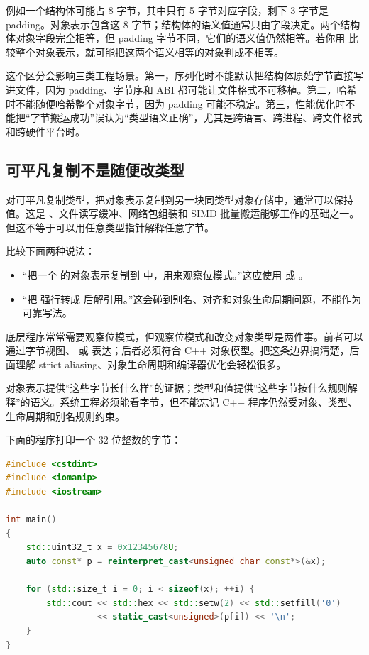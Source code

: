 例如一个结构体可能占 8 字节，其中只有 5 字节对应字段，剩下 3 字节是 padding。对象表示包含这 8 字节；结构体的语义值通常只由字段决定。两个结构体对象字段完全相等，但 padding 字节不同，它们的语义值仍然相等。若你用  比较整个对象表示，就可能把这两个语义相等的对象判成不相等。

这个区分会影响三类工程场景。第一，序列化时不能默认把结构体原始字节直接写进文件，因为 padding、字节序和 ABI 都可能让文件格式不可移植。第二，哈希时不能随便哈希整个对象字节，因为 padding 可能不稳定。第三，性能优化时不能把“字节搬运成功”误认为“类型语义正确”，尤其是跨语言、跨进程、跨文件格式和跨硬件平台时。

\subsection{可平凡复制不是随便改类型}

对可平凡复制类型，把对象表示复制到另一块同类型对象存储中，通常可以保持值。这是 、文件读写缓冲、网络包组装和 SIMD 批量搬运能够工作的基础之一。但这不等于可以用任意类型指针解释任意字节。

比较下面两种说法：

\begin{itemize}
  \item “把一个  的对象表示复制到  中，用来观察位模式。”这应使用  或 。
  \item “把  强行转成  后解引用。”这会碰到别名、对齐和对象生命周期问题，不能作为可靠写法。
\end{itemize}

底层程序常常需要观察位模式，但观察位模式和改变对象类型是两件事。前者可以通过字节视图、 或  表达；后者必须符合 C++ 对象模型。把这条边界搞清楚，后面理解 strict aliasing、对象生命周期和编译器优化会轻松很多。

\begin{warningbox}
对象表示提供“这些字节长什么样”的证据；类型和值提供“这些字节按什么规则解释”的语义。系统工程必须能看字节，但不能忘记 C++ 程序仍然受对象、类型、生命周期和别名规则约束。
\end{warningbox}

下面的程序打印一个 32 位整数的字节：

\begin{lstlisting}[language=C++]
#include <cstdint>
#include <iomanip>
#include <iostream>

int main()
{
    std::uint32_t x = 0x12345678U;
    auto const* p = reinterpret_cast<unsigned char const*>(&x);

    for (std::size_t i = 0; i < sizeof(x); ++i) {
        std::cout << std::hex << std::setw(2) << std::setfill('0')
                  << static_cast<unsigned>(p[i]) << '\n';
    }
}
\end{lstlisting}

